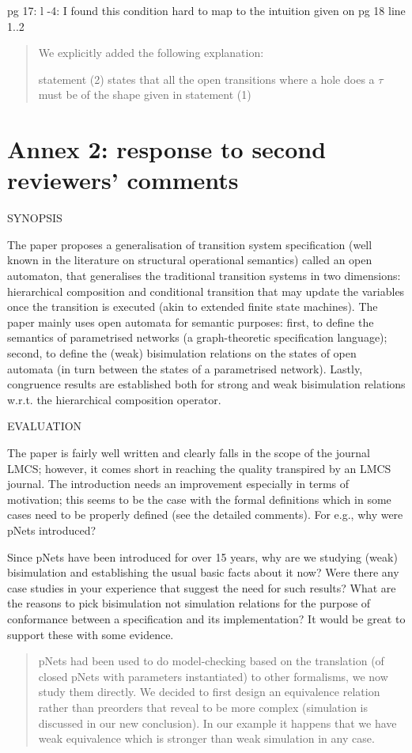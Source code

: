 \documentclass{article}
\begin{document}
pg 17: l -4: I found this condition hard to map to the intuition given on pg 18 line 1..2 
\begin{quote}
We explicitly added the following explanation:

statement (2) states that all the open transitions where a hole does  a $\tau$ must be of the shape given in statement (1)
\end{quote}


\section*{Annex 2: response to second reviewers' comments}
SYNOPSIS

The paper proposes a generalisation of transition system specification (well known in the literature on structural operational semantics) called an open automaton, that generalises the traditional transition systems in two dimensions: hierarchical composition and conditional transition that may update the variables once the transition is executed (akin to extended finite state machines). The paper mainly uses open automata for semantic purposes: first, to define the semantics of parametrised networks (a graph-theoretic specification language); second, to define the (weak) bisimulation relations on the states of open automata (in turn between the states of a parametrised network). Lastly, congruence results are established both for strong and weak bisimulation relations w.r.t. the hierarchical composition operator.

EVALUATION

The paper is fairly well written and clearly falls in the scope of the journal LMCS; however, it comes short in reaching the quality transpired by an LMCS journal.
The introduction needs an improvement especially in terms of motivation; this seems to be the case with the formal definitions which in some cases need to be properly defined (see the detailed comments). For e.g., why were pNets introduced? 

Since pNets have been introduced for over 15 years, why are we studying (weak) bisimulation and establishing the usual basic facts about it now? Were there any case studies in your experience that suggest the need for such results? What are the reasons to pick bisimulation not simulation relations for the purpose of conformance between a specification and its implementation? It would be great to support these with some evidence.

\begin{quote}
pNets had been used to do model-checking based on the translation (of closed pNets with parameters instantiated) to other formalisms, we now study them directly. We decided to first design an equivalence relation rather than  preorders that reveal to be more complex (simulation is discussed in our new conclusion). In our example it happens that we have weak equivalence which is stronger than weak simulation in any case.
\end{quote}
\end{document}
